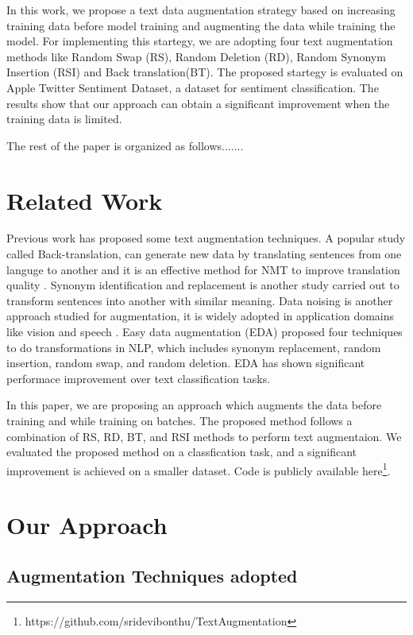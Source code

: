 \documentclass{article}
\begin{document}
In this work, we propose a text data augmentation strategy based on increasing training data before model training and augmenting the data while training the model. For implementing this startegy, we are adopting four text augmentation methods like Random Swap (RS), Random Deletion (RD), Random Synonym Insertion (RSI) and Back translation(BT). The proposed startegy is evaluated on Apple Twitter Sentiment Dataset, a dataset for sentiment classification. The results show that our approach can obtain a significant improvement when the training data is limited.

The rest of the paper is organized as follows.......


\section{Related Work}
Previous work has proposed some text augmentation techniques. A popular study called Back-translation, can generate new data by translating sentences from one languge to another and it is an effective method for NMT to improve translation quality \cite{fadaee2018back}. Synonym identification and replacement \cite{anders2020dynamic} is another study carried out to transform sentences into another with similar meaning. Data noising is another approach studied for augmentation, it is widely adopted in application domains like vision and speech \cite{xie2017data}. Easy data augmentation (EDA)\cite{wei2019eda} proposed four techniques to do transformations in NLP, which includes synonym replacement, random insertion, random swap, and random deletion. EDA has shown significant performace improvement over text classification tasks.

In this paper, we are proposing an approach which augments the data before training and while training on batches. The proposed method follows a combination of RS, RD, BT, and RSI methods to perform text augmentaion. We evaluated the proposed method on a classfication task, and a significant improvement is achieved on a smaller dataset. Code is publicly available here\footnote{https://github.com/sridevibonthu/TextAugmentation}.


\section{Our Approach}
\subsection{Augmentation Techniques adopted}
\end{document}
